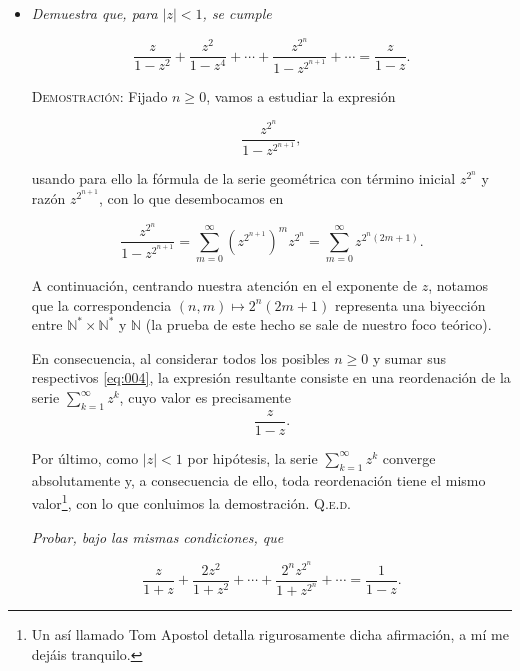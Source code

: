 \documentclass{article}
\begin{document}
\begin{itemize}
    \hfill{\textsc{Q.e.d.}}

    \vspace{12px}

    \item \textit{Demuestra que, para $|z| < 1$, se cumple}
    
    \[\frac{z}{1 - z^2} + \frac{z^2}{1 - z^4} + \cdots + \frac{z^{2^n}}{1 - z^{2^{n+1}}} + \cdots = \frac{z}{1-z}.\]

    \vspace{7px}

    \textsc{Demostración}: Fijado $n \geq 0$, vamos a estudiar la expresión 
    
    \begin{equation}
        \frac{z^{2^n}}{1-z^{2^{n+1}}},
        \label{eq:004}
    \end{equation}
    
    usando para ello la fórmula de la serie geométrica con término inicial $z^{2^n}$ y razón $z^{2^{n+1}}$, con lo que desembocamos en

    \[\frac{z^{2^n}}{1-z^{2^{n+1}}} = \sum_{m=0}^{\infty} \left(z^{2^{n+1}}\right)^mz^{2^n} = \sum_{m=0}^{\infty} z^{2^n(2m + 1)}.\]

    A continuación, centrando nuestra atención en el exponente de $z$, notamos que la correspondencia $(n, m) \mapsto 2^n(2m + 1)$ representa una biyección entre $\mathbb{N}^* \times \mathbb{N}^*$ y $\mathbb{N}$ (la prueba de este hecho se sale de nuestro foco teórico). 
    
    En consecuencia, al considerar todos los posibles $n \geq 0$ y sumar sus respectivos \eqref{eq:004}, la expresión resultante consiste en una reordenación de la serie $\sum_{k=1}^{\infty} z^k$, cuyo valor es precisamente \[\frac{z}{1-z}.\]

    Por último, como $|z| < 1$ por hipótesis, la serie $\sum_{k=1}^{\infty} z^k$ converge absolutamente y, a consecuencia de ello, toda reordenación tiene el mismo valor\footnote{Un así llamado Tom Apostol detalla rigurosamente dicha afirmación, a mí me dejáis tranquilo.}, con lo que conluimos la demostración. \hfill{\textsc{Q.e.d.}}

    \newpage

    \textit{Probar, bajo las mismas condiciones, que}

    \begin{equation}
        \frac{z}{1+z} + \frac{2z^2}{1+z^2} + \cdots + \frac{2^nz^{2^n}}{1+z^{2^n}} + \cdots = \frac{1}{1-z}.
        \label{eq:005}
    \end{equation}


\end{itemize}
\end{document}
